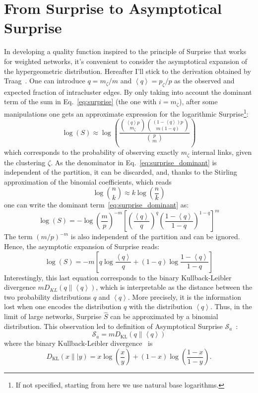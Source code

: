 \section{From Surprise to Asymptotical Surprise}
In developing a quality function inspired to the principle of Surprise that works for weighted networks, it's convenient to consider the asymptotical expansion of the hypergeometric distribution. Hereafter I'll stick to the derivation obtained by Traag~\cite{traag2015}.
One can introduce $q=m_\zeta/m$ and $\left<q \right>=p_\zeta/p$ as the observed and expected fraction of intracluster edges. By only taking into account the dominant term of the sum in Eq.~\ref{eq:surprise} (the one with $i=m_\zeta$), after some manipulations one gets an approximate expression for the logarithmic Surprise\footnote{If not specified, starting from here we use natural base logarithms.}:
\begin{equation}\label{eq:surprise_dominant}
\log(S) \approx \log \left( \frac{\binom{\left<q\right> p}{m_\zeta} \binom{(1-\left<q\right>)p}{m(1-q)}}{\binom{p}{m}} \right)
\end{equation}
which corresponds to the probability of observing exactly $m_\zeta$ internal links, given the clustering $\zeta$.
As the denominator in Eq.~\ref{eq:surprise_dominant} is independent of the partition, it can be discarded, and, thanks to the Stirling approximation of the binomial coefficients, which reads 
\begin{equation}
\log \binom{n}{k} \approx k \log \left( \frac{n}{k} \right)
\end{equation}
one can write the dominant term~\ref{eq:surprise_dominant} as:
\begin{equation}
\log(S) = - \log \left(\frac{m}{p}\right)^{-m} \left[ \left(\frac{\left< q\right>}{q}\right)^q \left(\frac{1-\left< q\right>}{1-q}\right)^{1-q} \right]^{m}
\end{equation}
The term $(m/p)^{-m}$ is also independent of the partition and can be ignored.
Hence, the asymptotic expansion of Surprise reads:
\begin{equation}
\log(S) = -m \left[ q \log \frac{\left<q\right>}{q} + (1-q)\log \frac{1-\left<q\right>}{1-q} \right]
\end{equation}
Interestingly, this last equation corresponds to the binary Kullback-Leibler divergence $m D_{KL}(q \| \left< q \right>)$, which is interpretable as the distance between the two probability distributions $q$ and $\left<q\right>$.
More precisely, it is the information lost when one encodes the distribution $q$ with the distribution $\left< q\right>$.
Thus, in the limit of large networks, Surprise $\hat{S}$ can be approximated by a binomial distribution.
This observation led to definition of Asymptotical Surprise $\mathcal{S}_a$~\cite{traag2015}:
\begin{equation}\label{eq:asymptoticalsurprise}
\mathcal{S}_a = m D_{\textrm{KL}}\left( q \| \left< q \right> \right)
\end{equation}
where the binary Kullback-Leibler divergence~\cite{kullback1951,cover2006} is $$D_{\textrm{KL}}(x\|| y) = x \log \left(\frac{x}{y} \right) + (1-x)\log \left (\frac{1-x}{1-y} \right).$$

